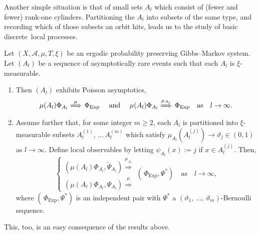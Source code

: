 \documentclass[AHL,Unicode,longabstracts]{cedram}
\newcommand{\clA}{\mathcal{A}}
\newcommand{\Expl}{\mathrm{Exp}}
\newcommand*{\alphenumi}{\renewcommand*{\theenumi}{\alph{enumi}}}
\begin{document}
Another simple situation is that of small sets $A_{l}$ which consist of (fewer and fewer) rank-one cylinders. Partitioning the $A_{l}$ into subsets of the same type, and recording which of those subsets an orbit hits, leads us to the study of basic discrete\ local processes.

\begin{theo}\label{T_PoissonAsyGMUnionCyls}
Let $(X,\clA,\mu,T,\xi)$ be an ergodic probability preserving Gibbs--Markov system. Let $(A_{l})$ be a sequence of asymptotically rare events such that each $A_{l}$ is $\xi $-measurable.
\begin{enumerate}\alphenumi
\item\label{theo10.2.a} Then $(A_{l})$ exhibits Poisson asymptotics,
\begin{equation}\label{Eq_tptptptptptpt}
\mu(A_{l})\Phi_{A_{l}}\overset{\mu}{\Longrightarrow}\,\Phi_{\Expl }\text{ \quad and \quad}\mu(A_{l})\Phi_{A_{l}}\overset{\mu_{A_{l}} }{\Longrightarrow}\,\Phi_{\Expl}\quad\text{as}\quad l\rightarrow
\infty.
\end{equation}
\item\label{theo10.2.b} Assume further that, for some integer $m\geq2$, each $A_{l}$ is partitioned into $\xi$-measurable subsets $A_{l}^{(1)},\,\ldots\,A_{l}^{(m)}$ which satisfy $\mu_{A_{l}}(A_{l}^{(j)})\rightarrow\vartheta_{j}\in(0,1)$ as $l\rightarrow\infty$. Define local observables by letting $\psi_{A_{l}}(x):=j$ if $x\in A_{l}^{(j)}$. Then,
\begin{equation}\label{Eq_GMJointLimits}
\begin{cases}
\left(\mu(A_{l})\Phi_{A_{l}},\widetilde{\Psi}_{A_{l}}\right)\overset{\mu_{A_{l}} }{\Longrightarrow}\\
\left(\mu(A_{l})\Phi_{A_{l}},\Psi_{A_{l}}\right)\overset{\mu}{\Longrightarrow}
\end{cases}
\left(\,\Phi_{\Expl},\Psi^{\ast}\right)\quad\text{as}\quad l\rightarrow
\infty, 
\end{equation}
where $(\,\Phi_{\Expl},\Psi^{\ast})$ is an independent pair with $\Psi^{\ast}$ a $(\vartheta_{1},\,\ldots,\,\vartheta_{m})$-Bernoulli sequence.
\end{enumerate}
\end{theo}

This, too, is an easy consequence of the results above.
\end{document}
